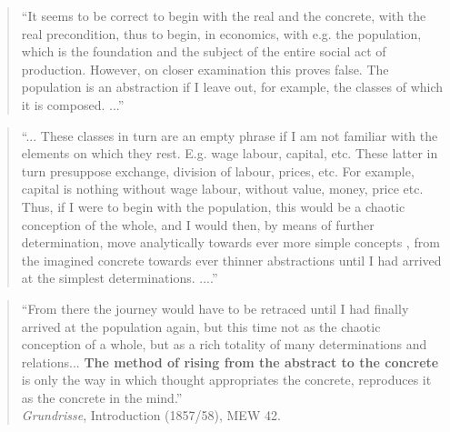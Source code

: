       \begin{quote}
      \footnotesize
      ``It seems to be correct to begin with the real and the concrete, with the real precondition, thus to begin, in economics, with e.g. the population, which is the foundation and the subject of the entire social act of production. However, on closer examination this proves false. The population is an abstraction if I leave out, for example, the classes of which it is composed. ...''
      \end{quote}




      \begin{quote}
      \footnotesize
      ``... These classes in turn are an empty phrase if I am not familiar with the elements on which they rest. E.g. wage labour, capital, etc. These latter in turn presuppose exchange, division of labour, prices, etc. For example, capital is nothing without wage labour, without value, money, price etc. Thus, if I were to begin with the population, this would be a chaotic conception  {\upshape [Vorstellung]} of the whole, and I would then, by means of further determination, move analytically towards ever more simple concepts  {\upshape [Begriff]}, from the imagined concrete towards ever thinner abstractions until I had arrived at the simplest determinations. ....''
      \end{quote}

    


      \begin{quote}
      \footnotesize
      ``From there the journey would have to be retraced until I had finally arrived at the population again, but this time not as the chaotic conception of a whole, but as a rich totality of many determinations and relations... \textbf{The method of rising from the abstract to the concrete} is only the way in which thought appropriates the concrete, reproduces it as the concrete in the mind.''
      \\
      \hfill{\scriptsize \emph{Grundrisse}, Introduction (1857/58), MEW 42.}
      \end{quote}


    




